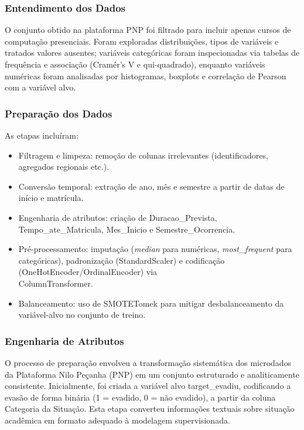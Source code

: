 \documentclass[english, spanish, brazilian]{RBIEarticle} %
\begin{document}
\subsubsection{Entendimento dos Dados}
O conjunto obtido na plataforma PNP foi filtrado para incluir apenas cursos de computação presenciais. Foram exploradas distribuições, tipos de variáveis e tratados valores ausentes; variáveis categóricas foram inspecionadas via tabelas de frequência e associação (Cramér’s V e qui-quadrado), enquanto variáveis numéricas foram analisadas por histogramas, boxplots e correlação de Pearson com a variável alvo.

\subsubsection{Preparação dos Dados}
As etapas incluíram:

\begin{itemize}
  \item Filtragem e limpeza: remoção de colunas irrelevantes (identificadores, agregados regionais etc.).
  
  \item Conversão temporal: extração de ano, mês e semestre a partir de datas de início e matrícula.
  
  \item Engenharia de atributos: criação de \mbox{Duracao\_Prevista}, \mbox{Tempo\_ate\_Matricula}, \mbox{Mes\_Inicio} e \mbox{Semestre\_Ocorrencia}.
  
  \item Pré-processamento: imputação (\textit{median} para numéricas, \mbox{\textit{most\_frequent}} para categóricas), padronização (StandardScaler) e codificação (OneHotEncoder/OrdinalEncoder) via \\ \mbox{ColumnTransformer}.
  
  \item Balanceamento: uso de SMOTETomek para mitigar desbalanceamento da variável-alvo no conjunto de treino.
\end{itemize}

\subsubsection{Engenharia de Atributos}
O processo de preparação envolveu a transformação sistemática dos microdados da Plataforma Nilo Peçanha (PNP) em um conjunto estruturado e analiticamente consistente.  
Inicialmente, foi criada a variável alvo \mbox{target\_evadiu}, codificando a evasão de forma binária (1 = evadido, 0 = não evadido), a partir da coluna Categoria da Situação. Esta etapa converteu informações textuais sobre situação acadêmica em formato adequado à modelagem supervisionada.
\end{document}
